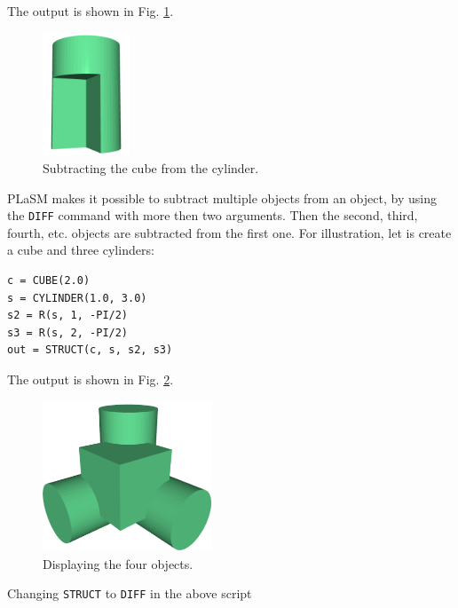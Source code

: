 \noindent
The output is shown in Fig. \ref{fig:diff-2}.


\begin{figure}[!ht]
\begin{center}
\includegraphics[width=0.23\textwidth]{img/diff-2.png}
\end{center}
\vspace{-4mm}
\caption{Subtracting the cube from the cylinder.}
\label{fig:diff-2}
\end{figure}
\newpage
\noindent
PLaSM makes it possible to subtract multiple objects from an 
object, by using  the {\tt DIFF} command with more then two arguments.
Then the second, third, fourth, etc. objects are subtracted
from the first one. For illustration, let is create a cube and
three cylinders:\\

\begin{bbox}
\begin{verbatim}
c = CUBE(2.0)
s = CYLINDER(1.0, 3.0)
s2 = R(s, 1, -PI/2)
s3 = R(s, 2, -PI/2)
out = STRUCT(c, s, s2, s3) 
\end{verbatim}
\end{bbox}
\vspace{6mm}

\noindent
The output is shown in Fig. \ref{fig:diff-3}.

\begin{figure}[!ht]
\begin{center}
\includegraphics[width=0.45\textwidth]{img/diff-3.png}
\end{center}
\vspace{-4mm}
\caption{Displaying the four objects.}
\label{fig:diff-3}
\vspace{-1cm}
\end{figure}
\noindent
\newpage
\noindent
Changing {\tt STRUCT} to {\tt DIFF} in the above script\\

